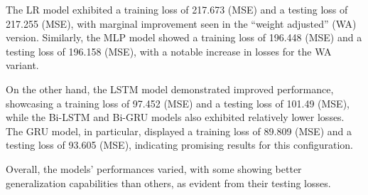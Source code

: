 The LR model exhibited a training loss of 217.673 (MSE) and a testing loss of 217.255 (MSE), with marginal improvement seen in the \enquote{weight adjusted} (WA) version.
Similarly, the MLP model showed a training loss of 196.448 (MSE) and a testing loss of 196.158 (MSE), with a notable increase in losses for the WA variant.

On the other hand, the LSTM model demonstrated improved performance, showcasing a training loss of 97.452 (MSE) and a testing loss of 101.49 (MSE), while the Bi-LSTM and Bi-GRU models also exhibited relatively lower losses.
The GRU model, in particular, displayed a training loss of 89.809 (MSE) and a testing loss of 93.605 (MSE), indicating promising results for this configuration.

Overall, the models' performances varied, with some showing better generalization capabilities than others, as evident from their testing losses.

